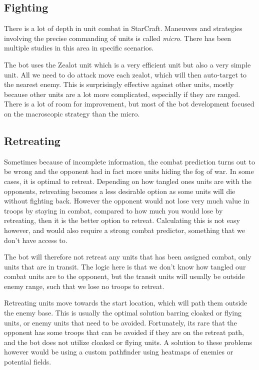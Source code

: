 	\subsection*{Fighting}
	There is a lot of depth in unit combat in StarCraft. Maneuvers and strategies involving the precise commanding of units is called \emph{micro}. There has been multiple studies in this area in specific scenarios.
	
	The bot uses the Zealot unit which is a very efficient unit but also a very simple unit. All we need to do attack move each zealot, which will then auto-target to the nearest enemy. This is surprisingly effective against other units, mostly because other units are a lot more complicated, especially if they are ranged. There is a lot of room for improvement, but most of the bot development focused on the macroscopic strategy than the micro.
	
	\subsection*{Retreating}	
	Sometimes because of incomplete information, the combat prediction turns out to be wrong and the opponent had in fact more units hiding the fog of war. In some cases, it is optimal to retreat. Depending on how tangled ones units are with the opponents, retreating becomes a less desirable option as some units will die without fighting back. However the opponent would not lose very much value in troops by staying in combat, compared to how much you would lose by retreating, then it is the better option to retreat. Calculating this is not easy however, and would also require a strong combat predictor, something that we don't have access to.
	
	The bot will therefore not retreat any units that has been assigned combat, only units that are in transit. The logic here is that we don't know how tangled our combat units are to the opponent, but the transit units will usually be outside enemy range, such that we lose no troops to retreat.

	Retreating units move towards the start location, which will path them outside the enemy base. This is usually the optimal solution barring cloaked or flying units, or enemy units that need to be avoided. Fortunately, its rare that the opponent has some troops that can be avoided if they are on the retreat path, and the bot does not utilize cloaked or flying units. A solution to these problems however would be using a custom pathfinder using heatmaps of enemies or potential fields.
	
